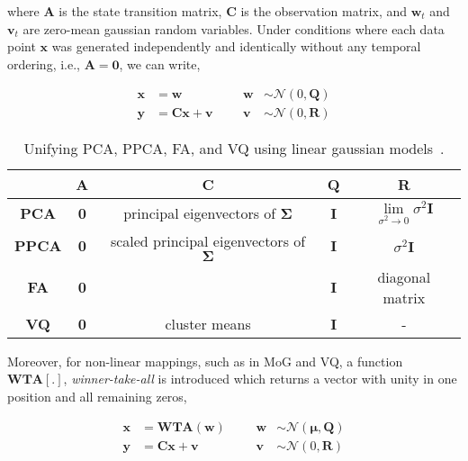 where $\mathbf{A}$ is the state transition matrix, $\mathbf{C}$ is the observation matrix, and $\mathbf{w}_t$ and $\mathbf{v}_t$ are zero-mean gaussian random variables.  Under conditions where each data point $\mathbf{x}$ was generated independently and identically without any temporal ordering, i.e., $\mathbf{A}=\mathbf{0}$, we can write,

\begin{equation}
\begin{array}{llllllllllllll}
\mathbf{x} &= \mathbf{w} 											& & & \mathbf{w} &\sim \mathcal{N}(0, \mathbf{Q})\\
\mathbf{y} &=  \mathbf{C}\mathbf{x} +  \mathbf{v} 		& & & \mathbf{v} & \sim \mathcal{N}(0, \mathbf{R})
\end{array}
\label{LGM1}
\end{equation}



\begin{table}[t]
\centering
\begin{tabular}{| c | c | c | c | c |}\hline
 				 	&\textbf{A}	 	&	\textbf{C}  									& \textbf{Q} 	&  \textbf{R}                                                                		\\\hline
\textbf{PCA} 	&\textbf{0}		&	principal eigenvectors of $\boldsymbol\Sigma$	& \textbf{I}  	&  $\lim\limits_{\sigma^2 \rightarrow 0} \sigma^2\mathbf{I}$ 	\\\hline
\textbf{PPCA} &\textbf{0}		& 	scaled principal eigenvectors of $\boldsymbol\Sigma$	& \textbf{I}	&										      $\sigma^2 \mathbf{I}$	 \\\hline
\textbf{FA}   	&\textbf{0}		&													& \textbf{I} 	&  diagonal matrix 																\\\hline
\textbf{VQ}	 	&\textbf{0} 	&	cluster means								& \textbf{I}	& 	-																					\\\hline
\end{tabular}
\caption{Unifying PCA, PPCA, FA, and VQ using linear gaussian models~\cite{1999_JNL_Gaussian_roweis, 1999_JNL_PPCA_Tipping}.}
\label{table:LGM_unifying}
\end{table}

Moreover, for non-linear mappings, such as in MoG and VQ, a function $\mathbf{WTA[.]}$, \emph{winner-take-all} is introduced which returns a vector with unity in one position and all remaining zeros,

\begin{equation}
\begin{array}{llllllllllllll}
\mathbf{x} &= \mathbf{WTA}(\mathbf{w}) 						& & & \mathbf{w} &\sim \mathcal{N}(\mathbf{\boldsymbol\mu}, \mathbf{Q})\\
\mathbf{y} &=  \mathbf{C}\mathbf{x} +  \mathbf{v} 		& & & \mathbf{v} & \sim \mathcal{N}(0, \mathbf{R})
\end{array}
\label{LGM2}
\end{equation}

